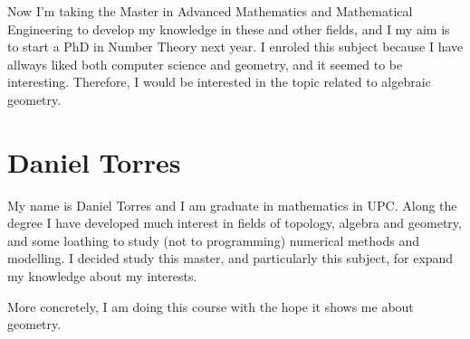 Now I'm taking the Master in Advanced Mathematics and Mathematical Engineering to develop my knowledge in these and other fields, and I my aim is to start a PhD in Number Theory next year. I enroled this subject because I have allways liked both computer science and geometry, and it seemed to be interesting. Therefore, I would be interested in the topic related to algebraic geometry.

\section{Daniel Torres}

My name is Daniel Torres and I am graduate in mathematics in UPC. Along the degree I have developed much interest in fields of topology, algebra and geometry, and some loathing to study (not to programming) numerical methods and modelling. I decided study this master, and particularly this subject, for expand my knowledge about my interests.

More concretely, I am doing this course with the hope it shows me about geometry.




